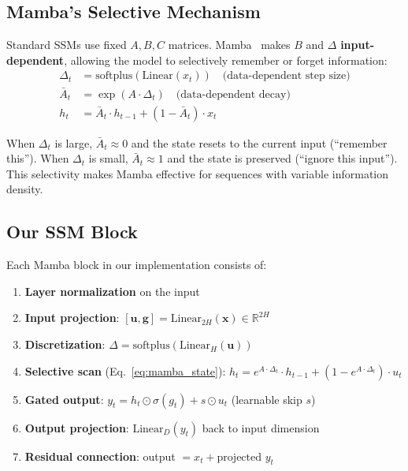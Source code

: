 \documentclass[11pt,a4paper]{article}
\begin{document}
\subsection{Mamba's Selective Mechanism}

Standard SSMs use fixed $A, B, C$ matrices. Mamba~\cite{gu2023mamba} makes $B$ and $\Delta$ \textbf{input-dependent}, allowing the model to selectively remember or forget information:
\begin{align}
  \Delta_t &= \text{softplus}(\text{Linear}(x_t)) \quad\text{(data-dependent step size)} \\
  \bar{A}_t &= \exp(A \cdot \Delta_t) \quad\text{(data-dependent decay)} \\
  h_t &= \bar{A}_t \cdot h_{t-1} + (1 - \bar{A}_t) \cdot x_t \label{eq:mamba_state}
\end{align}

When $\Delta_t$ is large, $\bar{A}_t \approx 0$ and the state resets to the current input (``remember this''). When $\Delta_t$ is small, $\bar{A}_t \approx 1$ and the state is preserved (``ignore this input''). This selectivity makes Mamba effective for sequences with variable information density.

\subsection{Our SSM Block}

Each Mamba block in our implementation consists of:

\begin{enumerate}[nosep]
  \item \textbf{Layer normalization} on the input
  \item \textbf{Input projection}: $[\mathbf{u}, \mathbf{g}] = \text{Linear}_{2H}(\mathbf{x}) \in \mathbb{R}^{2H}$
  \item \textbf{Discretization}: $\Delta = \text{softplus}(\text{Linear}_H(\mathbf{u}))$
  \item \textbf{Selective scan} (Eq.~\ref{eq:mamba_state}): $h_t = e^{A \cdot \Delta_t} \cdot h_{t-1} + (1 - e^{A \cdot \Delta_t}) \cdot u_t$
  \item \textbf{Gated output}: $y_t = h_t \odot \sigma(g_t) + s \odot u_t$ \quad (learnable skip $s$)
  \item \textbf{Output projection}: $\text{Linear}_D(y_t)$ back to input dimension
  \item \textbf{Residual connection}: output $= x_t + \text{projected } y_t$
\end{enumerate}
\end{document}
